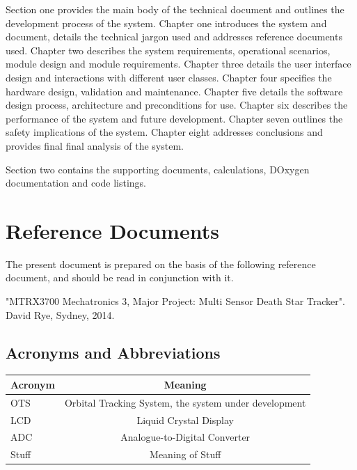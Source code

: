 \documentclass[]{report}
\begin{document}
Section one provides the main body of the technical document and outlines the development process of the system.\newline
Chapter one introduces the system and document, details the technical jargon used and addresses reference documents used. \newline
Chapter two describes the system requirements, operational scenarios, module design and module requirements. \newline
Chapter three details the user interface design and interactions with different user classes. \newline
Chapter four specifies the hardware design, validation and maintenance. \newline
Chapter five details the software design process, architecture and preconditions for use. \newline
Chapter six describes the performance of the system and future development. \newline
Chapter seven outlines the safety implications of the system. \newline
Chapter eight addresses conclusions and provides final final analysis of the system. \newline

Section two contains the supporting documents, calculations, DOxygen documentation and code listings.

\section{Reference Documents}
The present document is prepared on the basis of the following reference document, and should be read in conjunction with it.\newline

"MTRX3700 Mechatronics 3, Major Project: Multi Sensor Death Star Tracker".  David Rye, Sydney, 2014.
\subsection{Acronyms and Abbreviations}

\begin{center}
	\begin{tabular}{| l | c |}
		\hline
		Acronym & Meaning \\ \hline \hline
		OTS & Orbital Tracking System, the system under development \\ \hline
		LCD & Liquid Crystal Display \\ \hline
		ADC & Analogue-to-Digital Converter \\ \hline
		Stuff & Meaning of Stuff \\
		\hline
	\end{tabular}
\end{center}
\end{document}
